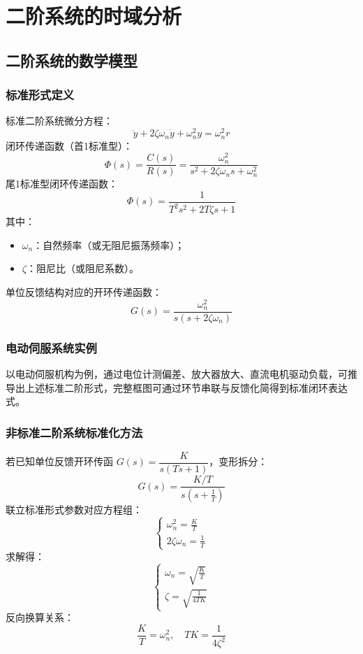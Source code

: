 \bigskip

\section{二阶系统的时域分析}
\subsection{二阶系统的数学模型}
\subsubsection{标准形式定义}
标准二阶系统微分方程：
\[
\ddot{y}+2\zeta\omega_n \dot{y}+\omega_n^2 y=\omega_n^2 r
\]
闭环传递函数（首1标准型）：
\[
\Phi(s)=\frac{C(s)}{R(s)}=\frac{\omega_n^2}{s^2+2\zeta\omega_n s+\omega_n^2}
\]
尾1标准型闭环传递函数：
\[
\Phi(s)=\frac{1}{T^2 s^2+2T\zeta s+1}
\]
其中：
\begin{itemize}
    \item $\omega_n$：自然频率（或无阻尼振荡频率）；
    \item $\zeta$：阻尼比（或阻尼系数）。
\end{itemize}

单位反馈结构对应的开环传递函数：
\[
G(s)=\frac{\omega_n^2}{s(s+2\zeta\omega_n)}
\]

\subsubsection{电动伺服系统实例}
以电动伺服机构为例，通过电位计测偏差、放大器放大、直流电机驱动负载，可推导出上述标准二阶形式，完整框图可通过环节串联与反馈化简得到标准闭环表达式。

\subsubsection{非标准二阶系统标准化方法}
若已知单位反馈开环传函 $G(s)=\dfrac{K}{s(Ts+1)}$，变形拆分：
\[
G(s)=\frac{K/T}{s\left(s+\frac1T\right)}
\]
联立标准形式参数对应方程组：
\[
\begin{cases}
\omega_n^2=\displaystyle\frac{K}{T}\\[4pt]
2\zeta\omega_n=\displaystyle\frac1T
\end{cases}
\]
求解得：
\[
\begin{cases}
\omega_n=\sqrt{\displaystyle\frac{K}{T}}\\[4pt]
\zeta=\sqrt{\displaystyle\frac{1}{4TK}}
\end{cases}
\]
反向换算关系：
\[
\frac{K}{T}=\omega_n^2,\quad TK=\frac{1}{4\zeta^2}
\]

